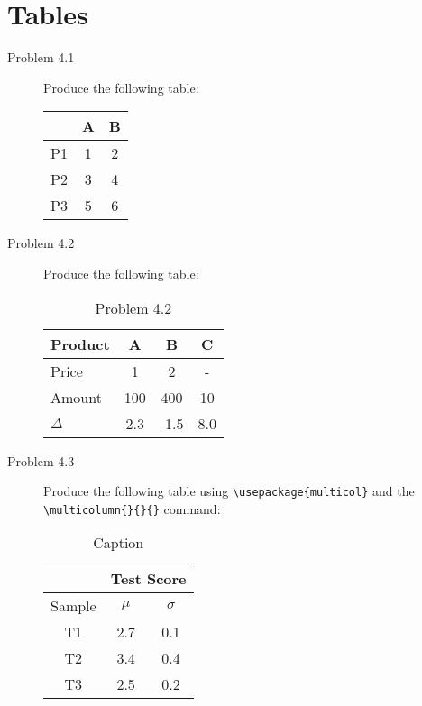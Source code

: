 \documentclass{article}
\begin{document}
\section{Tables}
\begin{description}
    \item[Problem 4.1] Produce the following table:\\
    \begin{table}[h]
        \centering
        \begin{tabular}{ccc}
        \hline
        & A & B\\
        \hline
        P1 & 1 & 2\\
        P2 & 3 & 4\\
        P3 & 5 & 6\\
        \hline
        \end{tabular}
    \end{table}
    \item[Problem 4.2] Produce the following table:\\
    \begin{table}[h]
        \centering
        \begin{tabular}{|l|c|c|c|}
            \hline
            Product & A & B & C\\
            \hline
            Price & 1 & 2 & -\\
            \hline
            Amount & 100 & 400 & 10\\
            \hline
            $\Delta$ & 2.3 & -1.5 & 8.0\\
            \hline
        \end{tabular}
        \caption{Problem 4.2}
        \label{tab:my_label}
    \end{table}
    \item[Problem 4.3] Produce the following table using \verb|\usepackage{multicol}| and the \verb|\multicolumn{}{}{}| command:\\
    \begin{table}[h]
        \centering
        \begin{tabular}{|c|c|c|}
            \hline 
            & \multicolumn{2}{|c|}{Test Score}\\
            \hline
            Sample & $\mu$ & $\sigma$\\
            \hline
            T1 & 2.7 & 0.1\\
            T2 & 3.4 & 0.4\\
            T3 & 2.5 & 0.2\\
            \hline
        \end{tabular}
        \caption{Caption}
        \label{tab:my_label}
    \end{table}
\end{description}
\end{document}
